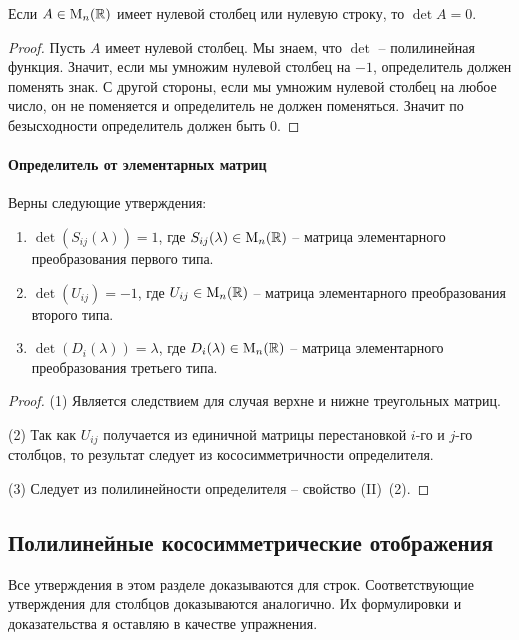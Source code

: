\begin{claim*}
Если $A\in\operatorname{M}_{n}(\mathbb R)$ имеет нулевой столбец или нулевую строку, то $\det A = 0$.
\end{claim*}
\begin{proof}
Пусть $A$ имеет нулевой столбец. Мы знаем, что $\det$ -- полилинейная функция. Значит, если мы умножим нулевой столбец на $-1$, определитель должен поменять знак. С другой стороны, если мы умножим нулевой столбец на любое число, он не поменяется и определитель не должен поменяться. Значит по безысходности определитель должен быть $0$.
\end{proof}



\paragraph{Определитель от элементарных матриц}

\begin{claim}
Верны следующие утверждения:
\begin{enumerate}
\item $\det (S_{ij}(\lambda)) = 1$, где $S_{ij}(\lambda)\in\operatorname{M}_{n}(\mathbb R)$ -- матрица элементарного преобразования первого типа.

\item $\det (U_{ij}) = -1$, где $U_{ij}\in\operatorname{M}_{n}(\mathbb R)$ -- матрица элементарного преобразования второго типа.

\item $\det(D_i(\lambda)) = \lambda$, где $D_{i}(\lambda)\in\operatorname{M}_{n}(\mathbb R)$ -- матрица элементарного преобразования третьего типа.
\end{enumerate}
\end{claim}
\begin{proof}
(1) Является следствием для случая верхне и нижне треугольных матриц.

(2) Так как $U_{ij}$ получается из единичной матрицы перестановкой $i$-го и $j$-го столбцов, то результат следует из кососимметричности определителя.

(3) Следует из полилинейности определителя -- свойство (II)~(2).
\end{proof}




\subsection{Полилинейные кососимметрические отображения}

Все утверждения в этом разделе доказываются для строк. Соответствующие утверждения для столбцов доказываются аналогично. Их формулировки и доказательства я оставляю в качестве упражнения.


